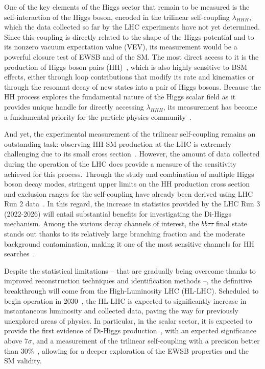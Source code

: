 One of the key elements of the Higgs sector that remain to be measured is the self-interaction of the Higgs boson, encoded in the trilinear self-coupling $\lambda_{HHH}$, which the data collected so far by the LHC experiments have not yet determined. Since this coupling is directly related to the shape of the Higgs potential and to its nonzero vacuum expectation value (VEV), its measurement would be a powerful closure test of EWSB and of the SM. The most direct access to it is the production of Higgs boson pairs (HH)~\cite{Baglio:2012np,DiMicco:2019ngk}, which is also highly sensitive to BSM effects, either through loop contributions that modify its rate and kinematics or through the resonant decay of new states into a pair of Higgs bosons. Because the HH process explores the fundamental nature of the Higgs scalar field as it provides unique handle for directly accessing $\lambda_{HHH}$, its measurement has become a fundamental priority for the particle physics community~\cite{deBlas:2025gyz}.

   
And yet, the experimental measurement of the trilinear self-coupling remains an outstanding task: observing HH SM production at the LHC is extremely challenging due to its small cross section~\cite{LHCHWG:HHlegacy}. However, the amount of data collected during the operation of the LHC does provide a measure of the sensitivity achieved for this process. Through the study and combination of multiple Higgs boson decay modes, stringent upper limits on the HH production cross section and exclusion ranges for the self-coupling have already been derived using LHC Run 2 data~\cite{ATLAS:2024ish,CMS_combination,ATLASCMS:2026HH}. In this regard, the increase in statistics provided by the LHC Run 3 (2022-2026) will entail substantial benefits for investigating the Di-Higgs mechanism. Among the various decay channels of interest, the $bb\tau\tau$ final state stands out thanks to its relatively large branching fraction and the moderate background contamination, making it one of the most sensitive channels for HH searches~\cite{CMS-HIG-20-010,ATLAS-HH-bbtautau-Run2}.

Despite the statistical limitations -- that are gradually being overcome thanks to improved reconstruction techniques and identification methods --, the definitive breakthrough will come from the High-Luminosity LHC (HL-LHC). Scheduled to begin operation in 2030~\cite{ZurbanoFernandez:2020cco,HLLHC-plan-2025}, the HL-LHC is expected to significantly increase in instantaneous luminosity and collected data, paving the way for previously unexplored areas of physics. In particular, in the scalar sector, it is expected to provide the first evidence of Di-Higgs production~\cite{ATLASCMS:2025HLLHC}, with an expected significance above $7\sigma$, and a measurement of the trilinear self-coupling with a precision better than $30\%$~\cite{ATLASCMS:2025HLLHC}, allowing for a deeper exploration of the EWSB properties and the SM validity.

